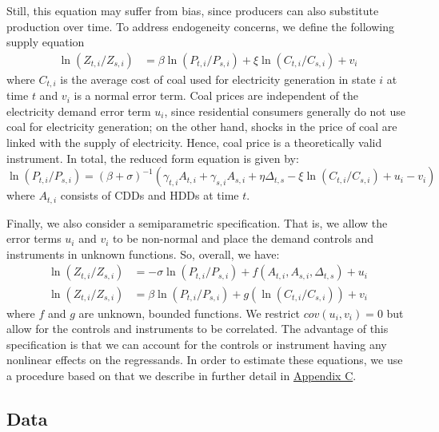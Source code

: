 \documentclass[11pt,a4paper,leqno]{extarticle}
\begin{document}
	Still, this equation may suffer from bias, since producers can also substitute production over time. To address endogeneity concerns, we define the following supply equation
	\begin{align*}
	\ln (Z_{ t, i} / Z_{ s, i}) &= \beta \ln (P_{t,i} / P_{s,i}) + \xi \ln (C_{t,i} / C_{s,i}) + v_{i}
	\end{align*}
	where $C_{t,i}$ is the average cost of coal used for electricity generation in state $i$ at time $t$ and $v_i$ is a normal error term. Coal prices are independent of the electricity demand error term $u_i$, since residential consumers generally do not  use coal for electricity generation; on the other hand, shocks in the price of coal are linked with the supply of electricity. Hence, coal price is a theoretically valid instrument.  In total, the reduced form equation is given by:
	\begin{equation}
	\ln (P_{t,i} / P_{s,i}) = \left( \beta + \sigma \right)^{-1} \left( \gamma_{t,i} A_{t,i} + \gamma_{s,i} A_{s,i} + \eta \Delta_{t,s} - \xi \ln (C_{t,i} / C_{s,i}) + u_{i} - v_i \right)  
	\end{equation}
	where $A_{t,i}$ consists of CDDs and HDDs at time $t$. 
	
	Finally, we also consider a semiparametric specification. That is, we allow the error terms $u_i$ and $v_i$ to be non-normal and place the demand controls and instruments in unknown functions. So, overall, we have:
	\begin{align}
	\ln (Z_{ t, i} / Z_{ s, i}) &= -\sigma \ln (P_{t,i} / P_{s,i}) +  f \left( A_{t,i}, A_{s,i}, \Delta_{t,s} \right) + u_i \\
	\ln (Z_{ t, i} / Z_{ s, i}) &= \beta \ln (P_{t,i} / P_{s,i}) + g \left( \ln (C_{t,i} / C_{s,i})  \right) + v_{i}
	\end{align}
	where $f$ and $g$ are unknown, bounded functions. We restrict $cov(u_i, v_i) = 0$ but allow for the controls and instruments to be correlated. The advantage of this specification is that we can account for the controls or instrument having any nonlinear effects on the regressands. In order to estimate these equations, we use a procedure based on \citet{Newey} that we describe in further detail in \hyperref[sec:AppendixC]{Appendix C}.  \noindent
	
	\noindent
	\subsection{Data}
	
\end{document}
